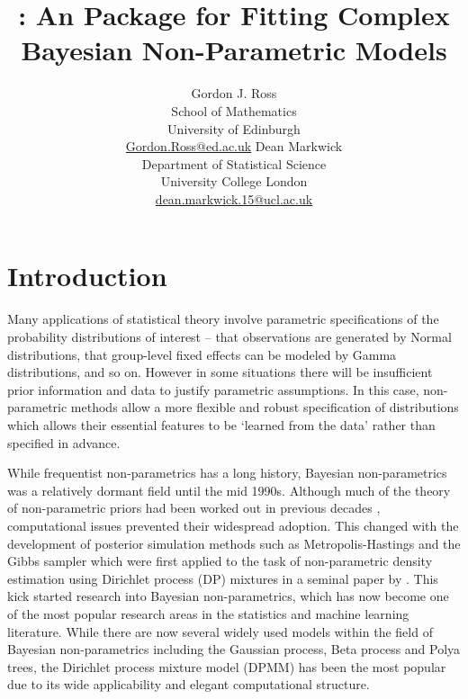 \documentclass[nojss]{jss}
\author{Gordon J. Ross\\School of Mathematics\\University of Edinburgh\\\href{Gordon.Ross@ed.ac.uk}{Gordon.Ross@ed.ac.uk} \And
Dean Markwick\\Department of Statistical Science\\University College London\\\href{dean.markwick.15@ucl.ac.uk}{dean.markwick.15@ucl.ac.uk}}
\title{\pkg{dirichletprocess}: An \proglang{R} Package for Fitting Complex Bayesian Non-Parametric Models}
\begin{document}


\section[Introduction]{Introduction} \label{sec:intro}

Many applications of statistical theory involve parametric specifications of the probability distributions of interest -- that observations are generated by Normal distributions, that group-level fixed effects can be modeled by Gamma distributions, and so on. However in some situations there will be insufficient prior information and data to justify parametric assumptions. In this case, non-parametric methods allow a more flexible and robust specification of distributions which allows their essential features to be `learned from the data' rather than specified in advance.

While frequentist non-parametrics has a long history, Bayesian non-parametrics was a relatively dormant field until the mid 1990s. Although much of the theory of non-parametric priors had been worked out in previous decades \citep{ferguson_bayesian_1973}, computational issues prevented their widespread adoption. This changed with the development of posterior simulation methods such as Metropolis-Hastings \citep{hastings_monte_1970} and the Gibbs sampler \citep{geman_stochastic_1984} which were first applied to the task of non-parametric density estimation using Dirichlet process (DP) mixtures in a seminal paper by \cite{escobar_bayesian_1995}. This kick started research into Bayesian non-parametrics, which has now become one of the most popular research areas in the statistics and machine learning literature. While there are now several widely used models within the field of Bayesian non-parametrics including the Gaussian process, Beta process and Polya trees, the Dirichlet process mixture model (DPMM) has been the most popular due to its wide applicability and elegant computational structure.
\end{document}
